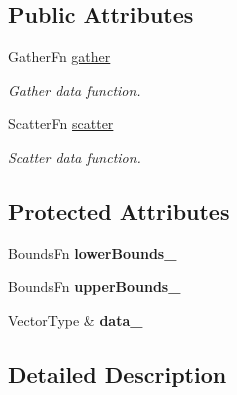 \subsection*{Public Attributes}
\begin{DoxyCompactItemize}
\item 
\hypertarget{classop_1_1Vector_ac47f3f0d85652684bef9103225779248}{Gather\-Fn \hyperlink{classop_1_1Vector_ac47f3f0d85652684bef9103225779248}{gather}}\label{classop_1_1Vector_ac47f3f0d85652684bef9103225779248}

\begin{DoxyCompactList}\small\item\em Gather data function. \end{DoxyCompactList}\item 
\hypertarget{classop_1_1Vector_a6f7d9555e36785fd21fd1b5bf78f0632}{Scatter\-Fn \hyperlink{classop_1_1Vector_a6f7d9555e36785fd21fd1b5bf78f0632}{scatter}}\label{classop_1_1Vector_a6f7d9555e36785fd21fd1b5bf78f0632}

\begin{DoxyCompactList}\small\item\em Scatter data function. \end{DoxyCompactList}\end{DoxyCompactItemize}
\subsection*{Protected Attributes}
\begin{DoxyCompactItemize}
\item 
\hypertarget{classop_1_1Vector_a262d4f23576f1ecfc33ac3c25c3385be}{Bounds\-Fn {\bfseries lower\-Bounds\-\_\-}}\label{classop_1_1Vector_a262d4f23576f1ecfc33ac3c25c3385be}

\item 
\hypertarget{classop_1_1Vector_aa4b8f274aee871c3298d0bb16e96f1e0}{Bounds\-Fn {\bfseries upper\-Bounds\-\_\-}}\label{classop_1_1Vector_aa4b8f274aee871c3298d0bb16e96f1e0}

\item 
\hypertarget{classop_1_1Vector_ab3b8d6c893a35917ef5729e8cd3d7bf3}{Vector\-Type \& {\bfseries data\-\_\-}}\label{classop_1_1Vector_ab3b8d6c893a35917ef5729e8cd3d7bf3}

\end{DoxyCompactItemize}


\subsection{Detailed Description}
